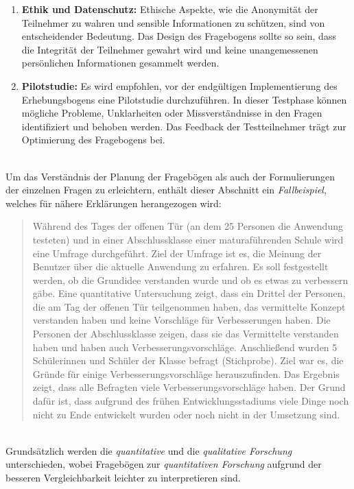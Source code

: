 \begin{enumerate}
    \item \textbf{Ethik und Datenschutz:}
    Ethische Aspekte, wie die Anonymität der Teilnehmer zu wahren und sensible Informationen zu schützen, sind von
    entscheidender Bedeutung. Das Design des Fragebogens sollte so sein, dass die Integrität der Teilnehmer gewahrt wird
    und keine unangemessenen persönlichen Informationen gesammelt werden.

    \item \textbf{Pilotstudie:}
    Es wird empfohlen, vor der endgültigen Implementierung des Erhebungsbogens eine Pilotstudie durchzuführen. In dieser
    Testphase können mögliche Probleme, Unklarheiten oder Missverständnisse in den Fragen identifiziert und behoben werden.
    Das Feedback der Testteilnehmer trägt zur Optimierung des Fragebogens bei.
\end{enumerate}
\\

Um das Verständnis der Planung der Fragebögen als auch der Formulierungen der einzelnen Fragen zu erleichtern, enthält
dieser Abschnitt ein \textit{Fallbeispiel}, welches für nähere Erklärungen herangezogen wird:
\begin{quote}
    Während des Tages der offenen Tür (an dem 25 Personen die Anwendung testeten) und in einer Abschlussklasse einer
    maturaführenden Schule wird eine Umfrage durchgeführt. Ziel der Umfrage ist es, die Meinung der Benutzer über die
    aktuelle Anwendung zu erfahren. Es soll festgestellt werden, ob die Grundidee verstanden wurde und ob es etwas zu
    verbessern gäbe. Eine quantitative Untersuchung zeigt, dass ein Drittel der Personen, die am Tag der offenen Tür
    teilgenommen haben, das vermittelte Konzept verstanden haben und keine Vorschläge für Verbesserungen haben. Die
    Personen der Abschlussklasse zeigen, dass sie das Vermittelte verstanden haben und haben auch Verbesserungsvorschläge.
    Anschließend wurden 5 Schülerinnen und Schüler der Klasse befragt (Stichprobe). Ziel war es, die Gründe für einige
    Verbesserungsvorschläge herauszufinden. Das Ergebnis zeigt, dass alle Befragten viele Verbesserungsvorschläge haben.
    Der Grund dafür ist, dass aufgrund des frühen Entwicklungsstadiums viele Dinge noch nicht zu Ende entwickelt wurden
    oder noch nicht in der Umsetzung sind.
\end{quote}
\\

Grundsätzlich werden die \textit{quantitative} und die \textit{qualitative Forschung} unterschieden, wobei Fragebögen
zur \textit{quantitativen Forschung} aufgrund der besseren Vergleichbarkeit leichter zu interpretieren sind.

